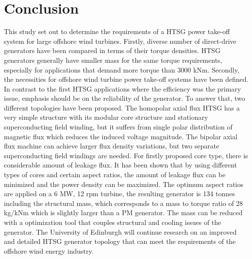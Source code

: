 \documentclass[final,peerreview,onecolumn]{IEEEtran}
\begin{document}
\section{Conclusion}
This study set out to determine the requirements of a HTSG power take-off system for large offshore wind turbines.  Firstly, diverse number of direct-drive generators have been compared in terms of their torque densities. HTSG generators generally have smaller mass for the same torque requirements, especially for applications that demand more torque than 3000 kNm. Secondly, the necessities for offshore wind turbine power take-off systems have been defined. In contrast to the first HTSG applications where the efficiency was the primary issue, emphasis should be on the reliability of the generator. To answer that, two different topologies have been proposed. The homopolar axial flux HTSG has a very simple structure with its modular core structure and stationary superconducting field winding, but it suffers from single polar distribution of magnetic flux which reduces the induced voltage magnitude. The bipolar axial flux machine can achieve larger flux density variations, but two separate superconducting field windings are needed. For firstly proposed core type, there is considerable amount of leakage flux. It has been shown that by using different types of cores and certain aspect ratios, the amount of leakage flux can be minimized and the power density can be maximized. The optimum aspect ratios are applied on a 6 MW, 12 rpm turbine, the resulting generator is 134 tonnes including the structural mass, which corresponds to a mass to torque ratio of 28 kg/kNm which is slightly larger than a PM generator. The mass can be reduced with a optimization tool that couples structural and cooling issues of the generator. The University of Edinburgh will continue research on an improved and detailed HTSG generator topology that can meet the requirements of the offshore wind energy industry.












\end{document}
